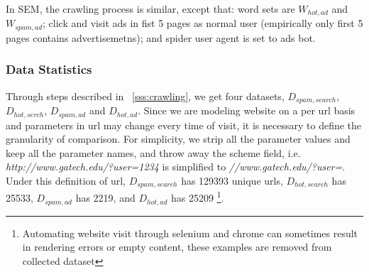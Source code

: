 In SEM, the crawling process is similar, except that: word sets are
$W_{hot, ad}$ and $W_{spam, ad}$; click and visit ads in fist 5 pages as normal
user (empirically only first 5 pages contains advertisemetns); 
and spider user agent is set to ads bot.

\subsubsection{Data Statistics}
Through steps described in ~\autoref{sss:crawling}, we get four datasets,
$D_{spam, search}$, $D_{hot, serch}$, $D_{spam, ad}$ and $D_{hot, ad}$.
Since we are modeling website on a per url basis and parameters in url may
change every time of visit, it is necessary to define the granularity of
comparison. For simplicity, we strip all the parameter
values and keep all the parameter names, and throw away the scheme field, i.e.
{\it http://www.gatech.edu/?user=1234} is simplified to
{\it //www.gatech.edu/?user=}. Under this definition of url, $D_{spam, search}$
has 129393 unique urls, $D_{hot, search}$ has 25533, $D_{spam, ad}$ has 2219,
and $D_{hot, ad}$ has 25209 
\footnote{Automating website visit through selenium
  and chrome can sometimes result in rendering errors or empty content, these
examples are removed from collected dataset}.


%

